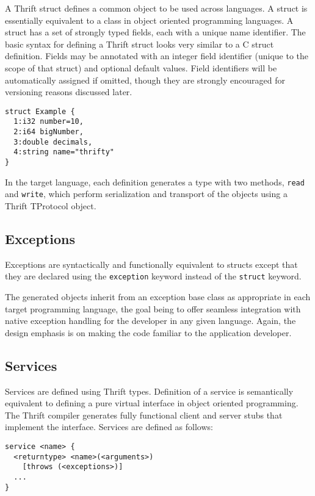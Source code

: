 \documentclass[nocopyrightspace,blockstyle]{sigplanconf}
\begin{document}
A Thrift struct defines a common object to be used across languages. A struct
is essentially equivalent to a class in object oriented programming
languages. A struct has a set of strongly typed fields, each with a unique
name identifier. The basic syntax for defining a Thrift struct looks very
similar to a C struct definition. Fields may be annotated with an integer field
identifier (unique to the scope of that struct) and optional default values.
Field identifiers will be automatically assigned if omitted, though they are
strongly encouraged for versioning reasons discussed later.

\begin{verbatim}
struct Example {
  1:i32 number=10,
  2:i64 bigNumber,
  3:double decimals,
  4:string name="thrifty"
}\end{verbatim}

In the target language, each definition generates a type with two methods,
\texttt{read} and \texttt{write}, which perform serialization and transport
of the objects using a Thrift TProtocol object.

\subsection{Exceptions}

Exceptions are syntactically and functionally equivalent to structs except
that they are declared using the \texttt{exception} keyword instead of the
\texttt{struct} keyword.

The generated objects inherit from an exception base class as appropriate
in each target programming language, the goal being to offer seamless
integration with native exception handling for the developer in any given
language. Again, the design emphasis is on making the code familiar to the
application developer.

\subsection{Services}

Services are defined using Thrift types. Definition of a service is
semantically equivalent to defining a pure virtual interface in object oriented
programming. The Thrift compiler generates fully functional client and
server stubs that implement the interface. Services are defined as follows:

\begin{verbatim}
service <name> {
  <returntype> <name>(<arguments>)
    [throws (<exceptions>)]
  ...
}\end{verbatim}
\end{document}
